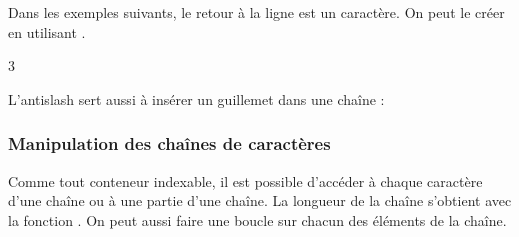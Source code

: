 \documentclass[letterpaper,10pt,english]{sphinxhowto}
\begin{document}
\sphinxAtStartPar
Dans les exemples suivants, le retour à la ligne est un caractère. On peut le créer en utilisant .

\begin{sphinxVerbatim}[commandchars=\\\{\}]
  
  
 
\end{sphinxVerbatim}

\begin{sphinxVerbatim}[commandchars=\\\{\}]
3
\end{sphinxVerbatim}

\sphinxAtStartPar
L’antislash sert aussi à insérer un guillemet dans une chaîne :

\begin{sphinxVerbatim}[commandchars=\\\{\}]
  
\end{sphinxVerbatim}


\subsubsection{Manipulation des chaînes de caractères}
\label{\detokenize{cours4_chaine_caractere_cours:manipulation-des-chaines-de-caracteres}}
\sphinxAtStartPar
Comme tout conteneur indexable, il est possible d’accéder à chaque caractère d’une chaîne ou à une partie d’une
chaîne. La longueur de la chaîne s’obtient avec la fonction . On peut aussi faire une boucle  sur chacun des éléments de la chaîne.

\begin{sphinxVerbatim}[commandchars=\\\{\}]
  
\PYG{p}{[}\PYG{p}{]}
\PYG{p}{[}\PYG{p}{]}
\end{sphinxVerbatim}
\end{document}

